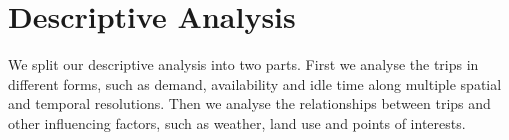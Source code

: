 \section{Descriptive Analysis}
\label{sec:descriptive_analysis}

We split our descriptive analysis into two parts. First we analyse the trips in different forms, such as demand, availability and idle time along multiple spatial and temporal resolutions. Then we analyse the relationships between trips and other influencing factors, such as weather, land use and points of interests.


\subsection{}
